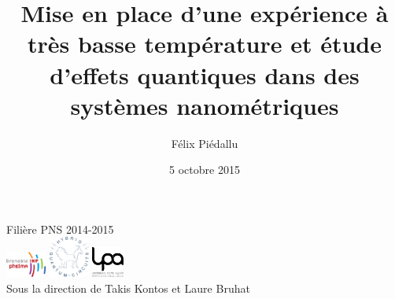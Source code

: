 \documentclass[10pt,a9paper,handout]{beamer} \usepackage[utf8]{inputenc} \usepackage[francais]{babel} \usepackage[T1]{fontenc}
\title{Mise en place d’une expérience à très basse température et étude d’effets quantiques dans des systèmes nanométriques}
\author{Félix Piédallu}
\date{5 octobre 2015}
\institute{Grenoble INP Phelma}
\begin{document}
\begin{frame}
    \vspace*{-.6cm}
    \maketitle
    \begin{center}
    \vspace*{-3.3cm}
    {\footnotesize Filière PNS 2014-2015}\\[1.2cm]
    \vspace*{1.6cm}
    \includegraphics[width=50px]{Images/logo_phelma}\qquad
    \includegraphics[width=50px]{Images/logo_HQC}\qquad
    \hspace*{10px}
    \includegraphics[width=40px]{Images/logo_lpa}\qquad
    \\[0.2cm]
    Sous la direction de Takis Kontos et Laure Bruhat
    \end{center}
\end{frame}

\begin{frame}
\tableofcontents
\end{frame}
\end{document}
